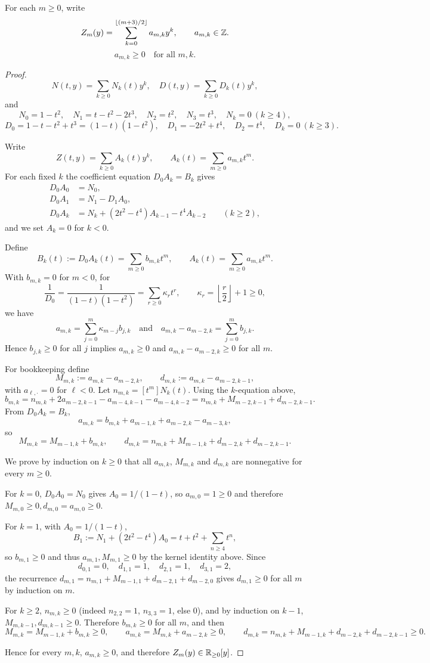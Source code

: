 \begin{theorem}\label{thm:coeff-nonneg}
For each $m\ge 0$, write
\[
Z_m(y)=\sum_{k=0}^{\lfloor (m+3)/2\rfloor} a_{m,k}y^k,\qquad a_{m,k}\in\mathbb{Z}.
\]
\[
a_{m,k}\ge 0\quad\text{for all }m,k.
\]
\begin{proof}
\[
N(t,y)=\sum_{k\ge0}N_k(t)y^k,\quad
D(t,y)=\sum_{k\ge0}D_k(t)y^k,
\]
and
\[
N_0=1-t^2,\quad
N_1=t-t^2-2t^3,\quad
N_2=t^2,\quad
N_3=t^3,\quad
N_k=0\ (k\ge4),
\]
\[
D_0=1-t-t^2+t^3=(1-t)(1-t^2),\quad
D_1=-2t^2+t^4,\quad
D_2=t^4,\quad
D_k=0\ (k\ge3).
\]

Write
\[
Z(t,y)=\sum_{k\ge0}A_k(t)y^k,\qquad
A_k(t)=\sum_{m\ge0}a_{m,k}t^m.
\]
For each fixed $k$ the coefficient equation $D_0A_k=B_k$ gives
\[
\begin{aligned}
D_0A_0&=N_0,\\
D_0A_1&=N_1- D_1A_0,\\
D_0A_k&=N_k+(2t^2-t^4)A_{k-1}-t^4A_{k-2}\qquad(k\ge2),
\end{aligned}
\]
and we set $A_k=0$ for $k<0$.

Define
\[
B_k(t):=D_0A_k(t)=\sum_{m\ge0}b_{m,k}t^m,\qquad
A_k(t)=\sum_{m\ge0}a_{m,k}t^m.
\]
With $b_{m,k}=0$ for $m<0$, for
\[
\frac1{D_0}=\frac1{(1-t)(1-t^2)}=\sum_{r\ge0}\kappa_r t^r,\qquad \kappa_r=\left\lfloor\frac r2\right\rfloor+1\ge0,
\]
we have
\[
a_{m,k}=\sum_{j=0}^m\kappa_{m-j}b_{j,k}
\quad\text{and}\quad
a_{m,k}-a_{m-2,k}=\sum_{j=0}^m b_{j,k}.
\]
Hence $b_{j,k}\ge0$ for all $j$ implies $a_{m,k}\ge0$ and $a_{m,k}-a_{m-2,k}\ge0$ for all $m$.

For bookkeeping define
\[
M_{m,k}:=a_{m,k}-a_{m-2,k},\qquad
d_{m,k}:=a_{m,k}-a_{m-2,k-1},
\]
with $a_{\ell,\cdot}=0$ for $\ell<0$.
Let $n_{m,k}=[t^m]N_k(t)$. Using the $k$-equation above,
\[
b_{m,k}
=n_{m,k}+2a_{m-2,k-1}-a_{m-4,k-1}-a_{m-4,k-2}
=n_{m,k}+M_{m-2,k-1}+d_{m-2,k-1}.
\]
From $D_0A_k=B_k$,
\[
a_{m,k}=b_{m,k}+a_{m-1,k}+a_{m-2,k}-a_{m-3,k},
\]
so
\[
M_{m,k}=M_{m-1,k}+b_{m,k},\qquad
d_{m,k}=n_{m,k}+M_{m-1,k}+d_{m-2,k}+d_{m-2,k-1}.
\]

We prove by induction on $k\ge0$ that all $a_{m,k}$, $M_{m,k}$ and $d_{m,k}$ are nonnegative for every $m\ge0$.

For $k=0$, $D_0A_0=N_0$ gives $A_0=1/(1-t)$, so $a_{m,0}=1\ge0$ and therefore $M_{m,0}\ge0,d_{m,0}=a_{m,0}\ge0$.

For $k=1$, with $A_0=1/(1-t)$,
\[
B_1:=N_1+(2t^2-t^4)A_0=t+t^2+\sum_{n\ge4}t^n,
\]
so $b_{m,1}\ge0$ and thus $a_{m,1},M_{m,1}\ge0$ by the kernel identity above. Since
\[
d_{0,1}=0,\quad d_{1,1}=1,\quad d_{2,1}=1,\quad d_{3,1}=2,
\]
the recurrence $d_{m,1}=n_{m,1}+M_{m-1,1}+d_{m-2,1}+d_{m-2,0}$ gives $d_{m,1}\ge0$ for all $m$ by induction on $m$.

For $k\ge2$, $n_{m,k}\ge0$ (indeed $n_{2,2}=1$, $n_{3,3}=1$, else $0$), and by induction on $k-1$, $M_{m,k-1},d_{m,k-1}\ge0$.
Therefore $b_{m,k}\ge0$ for all $m$, and then
\[
M_{m,k}=M_{m-1,k}+b_{m,k}\ge0,\qquad
a_{m,k}=M_{m,k}+a_{m-2,k}\ge0,\qquad
d_{m,k}=n_{m,k}+M_{m-1,k}+d_{m-2,k}+d_{m-2,k-1}\ge0.
\]

Hence for every $m,k$, $a_{m,k}\ge0$, and therefore $Z_m(y)\in\mathbb{R}_{\ge0}[y]$.
\end{proof}
\end{theorem}
